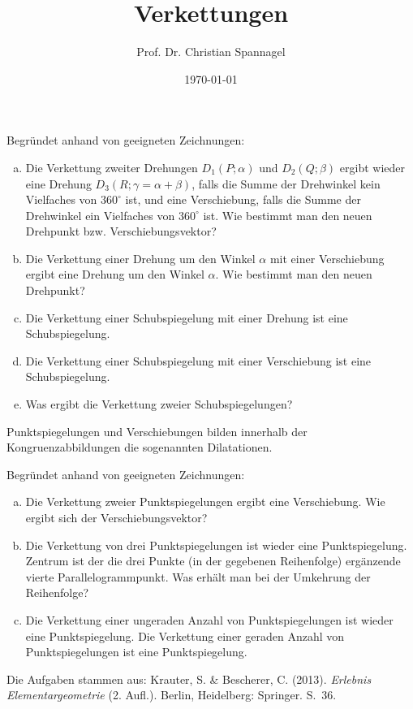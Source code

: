 \documentclass{cssheet}
\title{Verkettungen}
\author{Prof. Dr. Christian Spannagel}
\date{\today}
\begin{document}
\printtitle

\begin{aufgabe}

Begründet anhand von geeigneten Zeichnungen: 
\begin{enumerate}[a)]
\item Die Verkettung zweiter Drehungen $D_{1}(P;\alpha)$ und $D_{2}(Q;\beta)$ ergibt wieder eine Drehung $D_{3}(R;\gamma=\alpha+\beta)$, falls die Summe der Drehwinkel kein Vielfaches von $360^{\circ}$ ist, und eine Verschiebung, falls die Summe der Drehwinkel ein Vielfaches von $360^{\circ}$ ist. Wie bestimmt man den neuen Drehpunkt bzw. Verschiebungsvektor?
\item Die Verkettung einer Drehung um den Winkel $\alpha$ mit einer Verschiebung ergibt eine Drehung um den Winkel $\alpha$. Wie bestimmt man den neuen Drehpunkt?
\item Die Verkettung einer Schubspiegelung mit einer Drehung ist eine Schubspiegelung.
\item Die Verkettung einer Schubspiegelung mit einer Verschiebung ist eine Schubspiegelung.
\item Was ergibt die Verkettung zweier Schubspiegelungen?

\end{enumerate}
\end{aufgabe}

\begin{aufgabe}[Dilatationen]

Punktspiegelungen und Verschiebungen bilden innerhalb der Kongruenzabbildungen die sogenannten Dilatationen.

Begründet anhand von geeigneten Zeichnungen: 
\begin{enumerate}[a)]
	\item Die Verkettung zweier Punktspiegelungen ergibt eine Verschiebung. Wie ergibt sich der Verschiebungsvektor?
	\item Die Verkettung von drei Punktspiegelungen ist wieder eine Punktspiegelung. Zentrum ist der die drei Punkte (in der gegebenen Reihenfolge) ergänzende vierte Parallelogrammpunkt. Was erhält man bei der Umkehrung der Reihenfolge?
	\item Die Verkettung einer ungeraden Anzahl von Punktspiegelungen ist wieder eine Punktspiegelung. Die Verkettung einer geraden Anzahl von Punktspiegelungen ist eine Punktspiegelung.
\end{enumerate}
\end{aufgabe}

Die Aufgaben stammen aus: Krauter, S. \& Bescherer, C. (2013). \emph{Erlebnis Elementargeometrie} (2. Aufl.). Berlin, Heidelberg: Springer. S.~36.

\vspace*{10mm}

\printlicense

\printsocials
\end{document}
